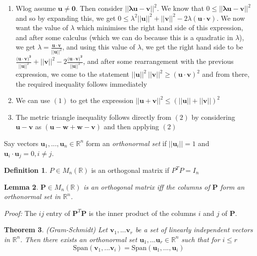 \documentclass{report}
\newtheorem{theorem}{Theorem}[subsection]
\newtheorem{lemma}[theorem]{Lemma}
\theoremstyle{remark}
\theoremstyle{definition}
\newtheorem{definition}[theorem]{Definition}
\theoremstyle{definition}
\theoremstyle{theorem}
\renewcommand{\v}[1]{\mathbf{#1}}
\begin{document}
\begin{enumerate}[label=\arabic*)]
    \item Wlog assume $\v{u} \neq \v{0}$. Then consider $||\v{\lambda u-v}||^2$. We know that $0\leq ||\v{\lambda u-v}||^2$ and so by expanding this, we get $0\leq \lambda^2||\v{u}||^2+||\v{v}||^2 - 2\lambda(\v{u\cdot v})$. We now want the value of $\lambda$ which minimises the right hand side of this expression, and after some calculus (which we can do because this is a quadratic in $\lambda$), we get $\lambda = \frac{\v{u\cdot v}}{||\v{u}||^2}$, and using this value of $\lambda$, we get the right hand side to be $\frac{(\v{u\cdot v)^2}}{||\v{u}||^2} +||\v{v}||^2 -2\frac{(\v{u\cdot v)^2}}{||\v{u}||^2}$, and after some rearrangement with the previous expression, we come to the statement $||\v{u}||^2 \> ||\v{v}||^2 \geq (\v{u \cdot v})^2$ and from there, the required inequality follows immediately
    \item We can use $(1)$ to get the expression $||\v{u+v}||^2 \leq (||\v{u}||+||\v{v}||)^2$
    \item The metric triangle inequality follows directly from $(2)$ by considering $\v{u-v}$ as $(\v{u-w+w-v})$ and then applying $(2)$ 
\end{enumerate}
Say vectors $\v{u}_1,...,\v{u}_n \in \mathbb{R}^n$ form an \emph{orthonormal set} if $||\v{u}_i||=1$ and $\v{u}_i\cdot\v{u}_j=0, i\neq j$.
\begin{definition}
$P \in M_n(\mathbb{R})$ is an orthogonal matrix if $P^TP=I_n$
\end{definition}
\begin{lemma}
$\v{P} \in M_n(\mathbb{R})$ is an orthogonal matrix iff the columns of $\v{P}$ form an orthonormal set in $\mathbb{R}^n$.
\end{lemma}
\emph{Proof:} The $ij$ entry of $\v{P}^T\v{P}$ is the inner product of the columns $i$ and $j$ of $\v{P}$.
\begin{theorem}
(Gram-Schmidt) Let $\v{v}_1,...\v{v}_r$ be a set of linearly independent vectors in $\mathbb{R}^n$. Then there exists an orthonormal set $\v{u}_1,...\v{u}_r \in \mathbb{R}^n$ such that for $i \leq r$ \[\mathrm{Span}(\v{v}_1,...\v{v}_i)= \mathrm{Span}(\v{u}_1,...,\v{u}_i)\]
\end{theorem}
\end{document}
